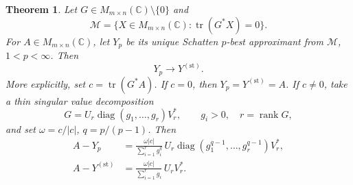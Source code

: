 \documentclass[11pt]{article}
\newtheorem{theorem}{Theorem}
\newcommand{\M}{\mathcal M}
\newcommand{\C}{\mathbb C}
\newcommand{\tr}{\operatorname{tr}}
\newcommand{\diag}{\operatorname{diag}}
\newcommand{\rank}{\operatorname{rank}}
\begin{document}
\begin{theorem}
Let \(G\in M_{m\times n}(\C)\setminus\{0\}\) and
\[
       \M=\{X\in M_{m\times n}(\C):\tr(G^*X)=0\}.
\]
For \(A\in M_{m\times n}(\C)\), let \(Y_p\) be its unique Schatten
\(p\)-best approximant from \(\M\), \(1<p<\infty\).  Then
\[
                         Y_p\longrightarrow Y^{(\mathrm{st})}.
\]
More explicitly, set \(c=\tr(G^*A)\).  If \(c=0\), then
\(Y_p=Y^{(\mathrm{st})}=A\).  If \(c\ne0\), take a thin singular value
decomposition
\[
 G=U_r\diag(g_1,\ldots,g_r)V_r^*,\qquad
 g_i>0,\quad r=\rank G,
\]
and set \(\omega=c/|c|\), \(q=p/(p-1)\).  Then
\begin{align}
 A-Y_p
   &=\frac{\omega |c|}{\sum_{i=1}^r g_i^q}\,
     U_r\diag\!\left(g_1^{q-1},\ldots,g_r^{q-1}\right)V_r^*,       \tag{1}\\
 A-Y^{(\mathrm{st})}
   &=\frac{\omega |c|}{\sum_{i=1}^r g_i}\,U_rV_r^*.              \tag{2}
\end{align}
\end{theorem}
\end{document}
